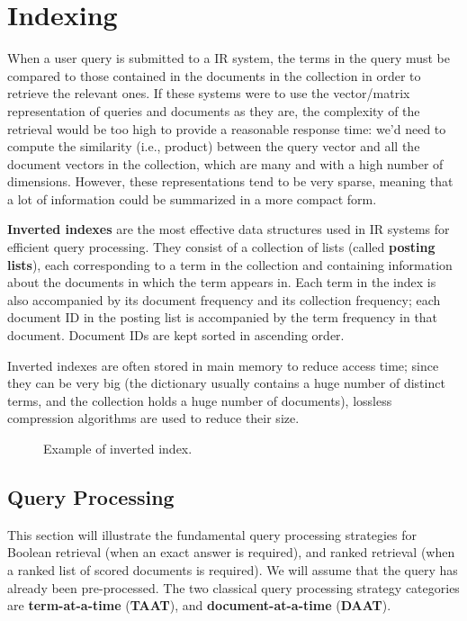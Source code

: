 \chapter{Indexing}

When a user query is submitted to a IR system, the terms in the query must be compared to those contained in the documents in the collection in order to retrieve the relevant ones. If these systems were to use the vector/matrix representation of queries and documents as they are, the complexity of the retrieval would be too high to provide a reasonable response time: we'd need to compute the similarity (i.e., product) between the query vector and all the document vectors in the collection, which are many and with a high number of dimensions. However, these representations tend to be very sparse, meaning that a lot of information could be summarized in a more compact form.

\textbf{Inverted indexes} are the most effective data structures used in IR systems for efficient query processing. They consist of a collection of lists (called \textbf{posting lists}), each corresponding to a term in the collection and containing information about the documents in which the term appears in. Each term in the index is also accompanied by its document frequency and its collection frequency; each document ID in the posting list is accompanied by the term frequency in that document. Document IDs are kept sorted in ascending order.

Inverted indexes are often stored in main memory to reduce access time; since they can be very big (the dictionary usually contains a huge number of distinct terms, and the collection holds a huge number of documents), lossless compression algorithms are used to reduce their size.
\clearpage
\begin{figure}[!h]
    \centering
    
    \caption{Example of inverted index.}
    \label{fig:inverted-index}
\end{figure}

\section{Query Processing}

This section will illustrate the fundamental query processing strategies for Boolean retrieval (when an exact answer is required), and ranked retrieval (when a ranked list of scored documents is required). We will assume that the query has already been pre-processed. The two classical query processing strategy categories are \textbf{term-at-a-time} (\textbf{TAAT}), and \textbf{document-at-a-time} (\textbf{DAAT}).

